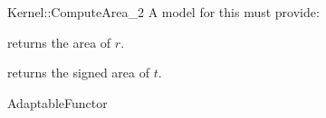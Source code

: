 \begin{ccRefFunctionObjectConcept}{Kernel::ComputeArea_2}
A model for this must provide:


       {returns the area of $r$. }

       {returns the signed area of $t$. }

\ccRefines
AdaptableFunctor

\ccSeeAlso
{} \\
  \\

\end{ccRefFunctionObjectConcept}
